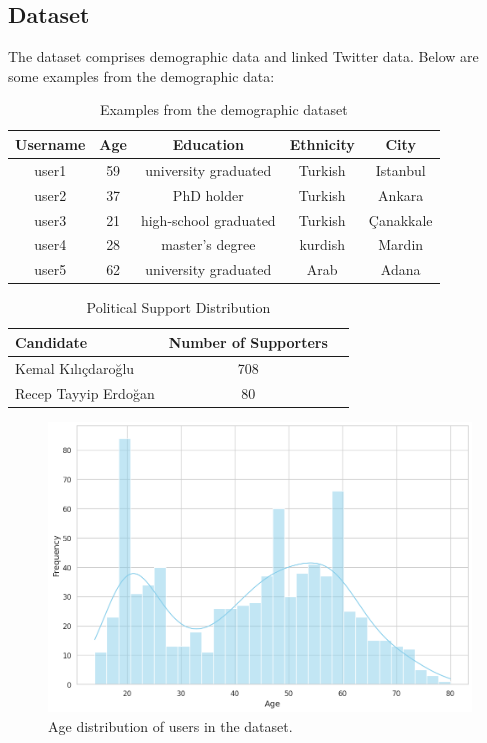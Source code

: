 \documentclass[sigconf,natbib=false]{acmart}
\begin{document}
\subsection{Dataset}
The dataset comprises demographic data and linked Twitter data. Below are some examples from the demographic data:

\begin{table}[h]
  \caption{Examples from the demographic dataset}
  \label{tab:dataset}
  \begin{tabular}{ccccc}
    \toprule
    \textbf{Username} & \textbf{Age} & \textbf{Education} & \textbf{Ethnicity} & \textbf{City} \\
    \midrule
    user1 & 59 & university graduated & Turkish & Istanbul \\
    user2 & 37 & PhD holder & Turkish & Ankara \\
    user3 & 21 & high-school graduated & Turkish & Çanakkale \\
    user4 & 28 & master's degree & kurdish & Mardin \\
    user5 & 62 & university graduated & Arab & Adana \\
    \bottomrule
  \end{tabular}
\end{table}


    
\begin{table}[h]
  \caption{Political Support Distribution}
  \label{tab:supporters}
  \begin{tabular}{lcc}
    \toprule
    \textbf{Candidate} & \textbf{Number of Supporters} \\
    \midrule
    Kemal Kılıçdaroğlu & 708 \\
    Recep Tayyip Erdoğan & 80 \\
    \bottomrule
  \end{tabular}
\end{table}

\begin{figure}[ht]
  \centering
  \includegraphics[width=\linewidth]{age.png}
  \caption{Age distribution of users in the dataset.}
  \label{fig:age_distribution}
\end{figure}
\end{document}
